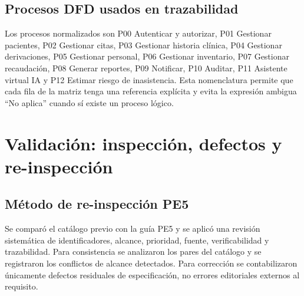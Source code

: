 \documentclass[11pt,a4paper]{article}
\begin{document}
\subsection{Procesos DFD usados en trazabilidad}
Los procesos normalizados son P00 Autenticar y autorizar, P01 Gestionar pacientes, P02 Gestionar citas, P03 Gestionar historia clínica, P04 Gestionar derivaciones, P05 Gestionar personal, P06 Gestionar inventario, P07 Gestionar recaudación, P08 Generar reportes, P09 Notificar, P10 Auditar, P11 Asistente virtual IA y P12 Estimar riesgo de inasistencia. Esta nomenclatura permite que cada fila de la matriz tenga una referencia explícita y evita la expresión ambigua ``No aplica'' cuando sí existe un proceso lógico.
\clearpage
\section{Validación: inspección, defectos y re-inspección}
\subsection{Método de re-inspección PE5}
Se comparó el catálogo previo con la guía PE5 y se aplicó una revisión sistemática de identificadores, alcance, prioridad, fuente, verificabilidad y trazabilidad. Para consistencia se analizaron los pares del catálogo y se registraron los conflictos de alcance detectados. Para corrección se contabilizaron únicamente defectos residuales de especificación, no errores editoriales externos al requisito.
\end{document}
